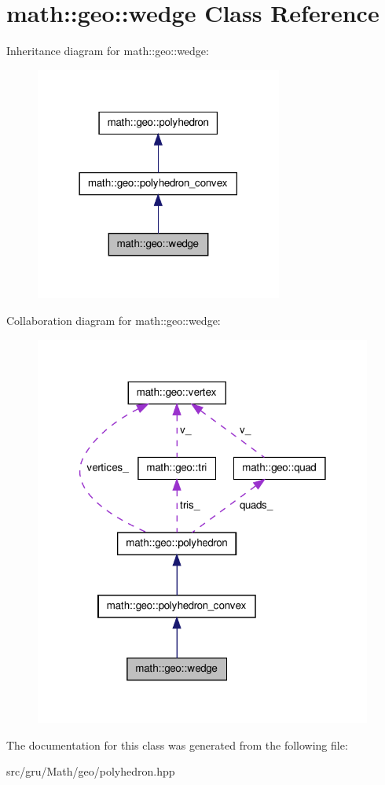 \hypertarget{classmath_1_1geo_1_1wedge}{\section{math\-:\-:geo\-:\-:wedge \-Class \-Reference}
\label{classmath_1_1geo_1_1wedge}
}


\-Inheritance diagram for math\-:\-:geo\-:\-:wedge\-:\nopagebreak
\begin{figure}[H]
\begin{center}
\leavevmode
\includegraphics[width=230pt]{classmath_1_1geo_1_1wedge__inherit__graph}
\end{center}
\end{figure}


\-Collaboration diagram for math\-:\-:geo\-:\-:wedge\-:\nopagebreak
\begin{figure}[H]
\begin{center}
\leavevmode
\includegraphics[width=314pt]{classmath_1_1geo_1_1wedge__coll__graph}
\end{center}
\end{figure}


\-The documentation for this class was generated from the following file\-:\begin{DoxyCompactItemize}
\item 
src/gru/\-Math/geo/polyhedron.\-hpp\end{DoxyCompactItemize}
